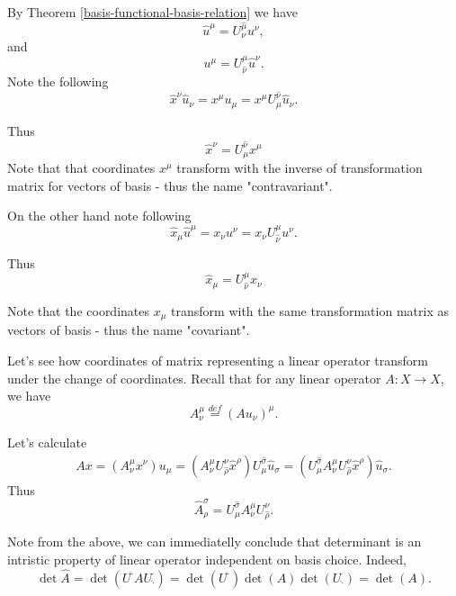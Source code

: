 \documentclass[main.tex]{subfiles}
\begin{document}
By Theorem \ref{basis-functional-basis-relation} we have
\begin{equation}
\hat{u}^\mu =  U^{\hat{\mu}}_{\nu} u^\nu,
\end{equation}
and 
\begin{equation}
u^\mu = U^{\mu}_{\hat{\nu}} \hat{u}^\nu.
\end{equation}
Note the following
\begin{equation}
\hat{x}^\nu \hat{u}_\nu = x^\mu u_\mu = x^\mu U^{\hat{\nu}}_\mu  \hat{u}_\nu.
\end{equation}

Thus
\begin{equation}
\label{u-contravariant}
\boxed{
\hat{x}^\nu = U^{\hat{\nu}}_\mu x^\mu 
}
\end{equation}
Note that that coordinates $x^\mu$ transform with the inverse of transformation matrix for vectors of basis - thus the name "contravariant".

On the other hand note following
\begin{equation}
\hat{x}_\mu \hat{u}^\mu = x_\nu u^\nu = x_\nu U^{\mu}_{\hat{\nu}} u^\nu.
\end{equation}

Thus
\begin{equation}
\boxed{
\hat{x}_\mu = U^{\mu}_{\hat{\nu}} x_\nu}
\end{equation}

Note that the coordinates $x_\mu$ transform with the same transformation matrix as vectors of basis - thus the name "covariant".

Let's see how coordinates of matrix representing a linear operator transform under the change of coordinates. Recall that for any linear operator $A: X \to X$, we have
\begin{equation}
A^\mu_\nu \stackrel{def}{=}(Au_\nu)^\mu.
\end{equation}

Let's calculate
\begin{align*}
Ax = (A^\mu_\nu x^\nu)u_\mu = (A^\mu_\nu U^\nu_{\hat{\rho}} \hat{x}^\rho) U^{\hat{\sigma}}_\mu  \hat{u}_\sigma = (U^{\hat{\sigma}}_\mu A^\mu_\nu U^\nu_{\hat{\rho}} \hat{x}^\rho) \hat{u}_\sigma.
\end{align*}
Thus
\begin{equation}
\label{matrix-under-change-of-coordinates}
\hat{A}^\sigma_\rho = U^{\hat{\sigma}}_\mu A^\mu_\nu U^\nu_{\hat{\rho}}.
\end{equation}

Note from the above, we can immediatelly conclude that determinant is an intristic property of linear operator independent on basis choice. Indeed,
\begin{equation}
\label{invariance-of-determinant}
\det \hat{A} = \det(U^{\hat{\cdot}}A U_{\hat{\cdot}}) = \det(U^{\hat{\cdot}})\det(A) \det(U_{\hat{\cdot}}) = \det(A).
\end{equation}   
\end{document}
